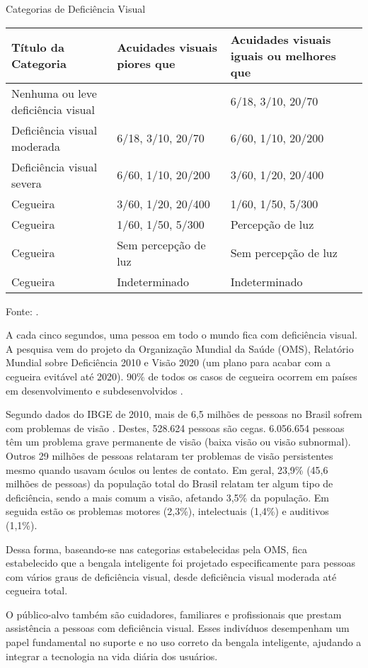 \begin{quadro}[!ht]
    \captionsetup{width=1.0\textwidth} %
    \caption{Categorias de Deficiência Visual}
    \begin{tabular}{p{}p{}p{}} %
        \toprule
         \textbf{Título da Categoria} & \textbf{Acuidades visuais piores que} & \textbf{Acuidades visuais iguais ou melhores que} \\
        \midrule
         Nenhuma ou leve deficiência visual &  & 6/18, 3/10, 20/70 \\
         Deficiência visual moderada & 6/18, 3/10, 20/70 & 6/60, 1/10, 20/200 \\
         Deficiência visual severa & 6/60, 1/10, 20/200 & 3/60, 1/20, 20/400 \\
         Cegueira & 3/60, 1/20, 20/400 & 1/60, 1/50, 5/300 \\
         Cegueira & 1/60, 1/50, 5/300 & Percepção de luz \\
         Cegueira & Sem percepção de luz &  Sem percepção de luz \\
         Cegueira & Indeterminado & Indeterminado \\
        \bottomrule
    \end{tabular}
    \caption*{Fonte: \cite{brock-2013}.} %
    \label{tab:categorias_deficiencia_visual}
\end{quadro}

A cada cinco segundos, uma pessoa em todo o mundo fica com deficiência visual. A pesquisa vem do projeto da Organização Mundial da Saúde (OMS), Relatório Mundial sobre Deficiência 2010 e Visão 2020 (um plano para acabar com a cegueira evitável até 2020). 90\% de todos os casos de cegueira ocorrem em países em desenvolvimento e subdesenvolvidos \cite{vision-2010}. 

Segundo dados do IBGE de 2010, mais de 6,5 milhões de pessoas no Brasil sofrem com problemas de visão \cite{mec-direitos-pcd}. Destes, 528.624 pessoas são cegas. 6.056.654 pessoas têm um problema grave permanente de visão (baixa visão ou visão subnormal). Outros 29 milhões de pessoas relataram ter problemas de visão persistentes mesmo quando usavam óculos ou lentes de contato. Em geral, 23,9\% (45,6 milhões de pessoas) da população total do Brasil relatam ter algum tipo de deficiência, sendo a mais comum a visão, afetando 3,5\% da população. Em seguida estão os problemas motores (2,3\%), intelectuais (1,4\%) e auditivos (1,1\%).

Dessa forma, baseando-se nas categorias estabelecidas pela OMS, fica estabelecido que a bengala inteligente foi projetado especificamente para pessoas com vários graus de deficiência visual, desde deficiência visual moderada até cegueira total.

O público-alvo também são cuidadores, familiares e profissionais que prestam assistência a pessoas com deficiência visual. Esses indivíduos desempenham um papel fundamental no suporte e no uso correto da bengala inteligente, ajudando a integrar a tecnologia na vida diária dos usuários.
